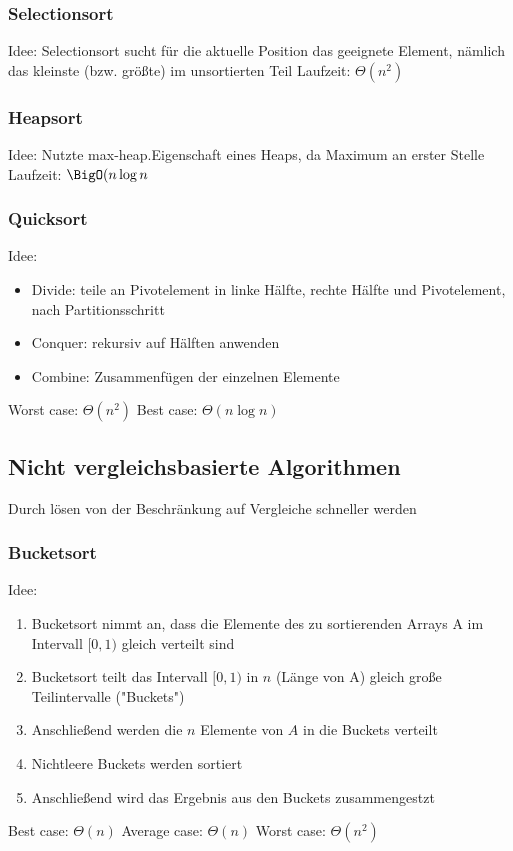 	\subsubsection{Selectionsort}
	Idee: Selectionsort sucht für die aktuelle Position das geeignete Element, nämlich  das kleinste (bzw. größte) im unsortierten Teil \newline \newline
	Laufzeit: $\Theta(n^2)$
	\subsubsection{Heapsort}
	Idee: Nutzte max-heap.Eigenschaft eines Heaps, da Maximum an erster Stelle \newline \newline
	Laufzeit: $\BigO(n\log n$ 
	\subsubsection{Quicksort}
	Idee: 
	\begin{itemize}
	  \item Divide: teile an Pivotelement in linke Hälfte, rechte Hälfte und Pivotelement, nach Partitionsschritt
	  \item Conquer: rekursiv auf Hälften anwenden
	  \item Combine: Zusammenfügen der einzelnen Elemente
	\end{itemize}
	Worst case: $\Theta(n^2)$ \newline
	Best case: $\Theta(n\log n)$
	\subsection{Nicht vergleichsbasierte Algorithmen}
	Durch lösen von der Beschränkung auf Vergleiche schneller werden
	\subsubsection{Bucketsort}
	Idee: 
	\begin{enumerate}
	  \item Bucketsort nimmt an, dass die Elemente des zu sortierenden Arrays A im Intervall $[0,1)$ gleich verteilt sind
	  \item Bucketsort teilt das Intervall $[0,1)$ in $n$ (Länge von A) gleich große Teilintervalle ("Buckets")
	  \item Anschließend werden die $n$ Elemente von $A$ in die Buckets verteilt
	  \item Nichtleere Buckets werden sortiert
	  \item Anschließend wird das Ergebnis aus den Buckets zusammengestzt
	\end{enumerate}
	Best case: $\Theta(n)$ \newline
	Average case: $\Theta(n)$ \newline
	Worst case: $\Theta(n^2)$
